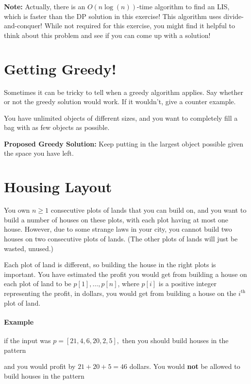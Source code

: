 \documentclass [12pt]{article}
\begin{document}
\textbf{Note:} Actually, there is an $O(n\log (n))$-time algorithm to find an LIS, which is faster than the DP solution in this exercise! This algorithm uses divide-and-conquer! While not required for this exercise, you might find it helpful to think about this problem and see if you can come up with a solution!
 
\section{Getting Greedy! }
Sometimes it can be tricky to tell when a greedy algorithm applies. Say whether or not the greedy solution would work. If it wouldn’t, give a counter example.

You have unlimited objects of different sizes, and you want to completely fill a bag with as few objects as possible.

\textbf{Proposed Greedy Solution:} Keep putting in the largest object possible given the space you have left.



\pagebreak
\section{Housing Layout } 
\label{sec:last}
You own $n \geq 1$ consecutive plots of lands that you can build on, and you want to build a number of houses on these plots, with each plot having at most one house. However, due to some strange laws in your city, you cannot build two houses on two consecutive plots of lands. (The other plots of lands will just be wasted, unused.) 

Each plot of land is different, so building the house in the right plots is important. You have estimated the profit you would get from building a house on each plot of land to be $p[1],\dots ,p[n]$, where $p[i]$ is a positive integer representing the profit, in dollars, you would get from building a house on the $i^{\text{th}}$ plot of land. 

\paragraph{Example} if the input was $ p = [21,4,6,20,2,5],$ then you should build houses in the pattern 
\begin{center} 
\end{center} and you would profit by $21+20+5 = 46$ dollars. You would \textbf{not} be allowed to build houses in the pattern 
\end{document}
